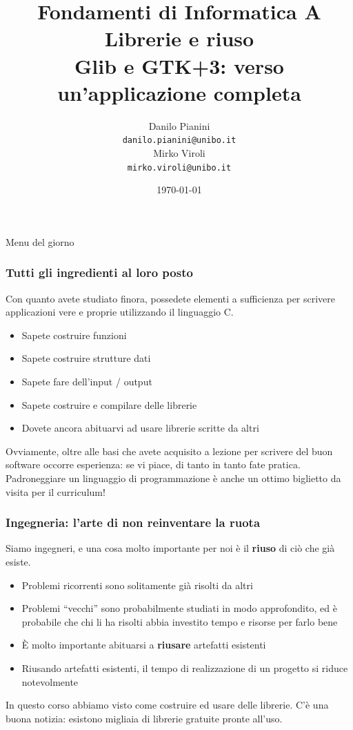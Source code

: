 \documentclass{beamer}
\begin{document}
\title[Lab1 - FV]{Fondamenti di Informatica A \\ Librerie e riuso \\ Glib e GTK+3: verso un'applicazione completa}
\author[Danilo Pianini]{Danilo Pianini\\\texttt{danilo.pianini@unibo.it} \\ \vspace{3pt} Mirko Viroli\\\texttt{mirko.viroli@unibo.it} }
\date[\today]{\today}

\frame{\titlepage} 
\begin{frame}{Menu del giorno}
\tableofcontents
\end{frame}


\begin{frame}
\frametitle{Tutti gli ingredienti al loro posto}
Con quanto avete studiato finora, possedete elementi a sufficienza per scrivere applicazioni vere e proprie utilizzando il linguaggio C.
\begin{itemize}
 \item Sapete costruire funzioni
 \item Sapete costruire strutture dati
 \item Sapete fare dell'input / output
 \item Sapete costruire e compilare delle librerie
 \item Dovete ancora abituarvi ad usare librerie scritte da altri
\end{itemize}
Ovviamente, oltre alle basi che avete acquisito a lezione per scrivere del buon software occorre esperienza: se vi piace, di tanto in tanto fate pratica. Padroneggiare un linguaggio di programmazione è anche un ottimo biglietto da visita per il curriculum!
\end{frame}

\begin{frame}
\frametitle{Ingegneria: l'arte di non reinventare la ruota}
Siamo ingegneri, e una cosa molto importante per noi è il \textbf{riuso} di ciò che già esiste.
\begin{itemize}
 \item Problemi ricorrenti sono solitamente già risolti da altri
 \item Problemi ``vecchi'' sono probabilmente studiati in modo approfondito, ed è probabile che chi li ha risolti abbia investito tempo e risorse per farlo bene
 \item È molto importante abituarsi a \textbf{riusare} artefatti esistenti
 \item Riusando artefatti esistenti, il tempo di realizzazione di un progetto si riduce notevolmente
\end{itemize}
In questo corso abbiamo visto come costruire ed usare delle librerie. C'è una buona notizia: esistono migliaia di librerie gratuite pronte all'uso.
\end{frame}
\end{document}
